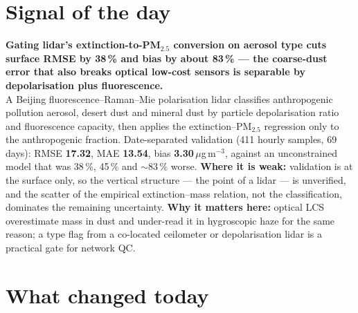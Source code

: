 \documentclass[10pt]{article}
\begin{document}
\vspace{6mm}

\section*{\sffamily\bfseries\color{Deep}Signal of the day}
\vspace{-1.5mm}{\color{Amber}\rule{\linewidth}{1.1pt}}\vspace{2.5mm}

\begin{keybox}
{\sffamily\bfseries\small\color{Deep}Gating lidar's extinction-to-PM$_{2.5}$ conversion on aerosol
type cuts surface RMSE by 38\,\% and bias by about 83\,\% --- the coarse-dust error that also breaks optical
low-cost sensors is separable by depolarisation plus fluorescence.}\\[1.4mm]
\footnotesize
A Beijing fluorescence--Raman--Mie polarisation lidar classifies anthropogenic pollution aerosol, desert dust and
mineral dust by particle depolarisation ratio and fluorescence capacity, then applies the extinction--PM$_{2.5}$
regression only to the anthropogenic fraction. Date-separated validation (411 hourly samples, 69 days): RMSE
\textbf{17.32}, MAE \textbf{13.54}, bias \textbf{3.30}\,$\mu$g\,m$^{-3}$, against an unconstrained model that was
38\,\%, 45\,\% and $\sim$83\,\% worse.
\textbf{Where it is weak:} validation is at the surface only, so the vertical structure --- the point of a lidar
--- is unverified, and the scatter of the empirical extinction--mass relation, not the classification, dominates the
remaining uncertainty.
\textbf{Why it matters here:} optical LCS overestimate mass in dust and under-read it in hygroscopic haze for the
same reason; a type flag from a co-located ceilometer or depolarisation lidar is a practical gate for network QC.\par
\end{keybox}

\vspace{3mm}

\section*{\sffamily\bfseries\color{Deep}What changed today}
\vspace{-1.5mm}{\color{Amber}\rule{\linewidth}{1.1pt}}\vspace{2.5mm}
\end{document}
